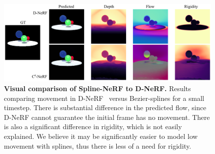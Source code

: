 \begin{figure}
    \includegraphics[width=\textwidth]{dnerf_compare}
    \caption{
        \label{fig:dnerf_cmp}
        \textbf{Visual comparison of Spline-NeRF to D-NeRF.}
        Results comparing movement in D-NeRF~\cite{pumarola2020dnerf} versus Bezier-splines for a small timestep. There is substantial difference in the predicted flow, since D-NeRF cannot guarantee the initial frame has no movement. There is also a significant difference in rigidity, which is not easily explained. We believe it may be significantly easier to model low movement with splines, thus there is less of a need for rigidity.
    }
\end{figure}
